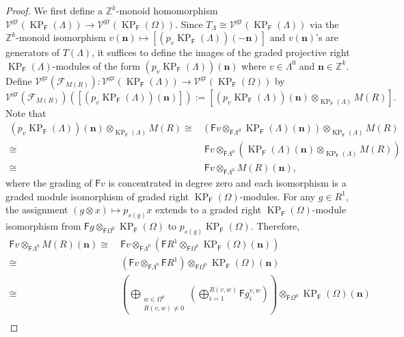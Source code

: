 \documentclass[12pt]{amsart}
\newcommand{\N}{\mathbf{n}}
\newcommand{\KP}{\operatorname{KP}}
\theoremstyle{definition}
\theoremstyle{remark}
\newcommand{\gr}{\operatorname{gr}}
\begin{document}
\begin{proof}
We first define a $\mathbb{Z}^k$-monoid homomorphism $\mathcal{V}^{\gr}(\KP_\mathsf{F}(\Lambda))\longrightarrow \mathcal{V}^{\gr}(\KP_\mathsf{F}(\Omega))$. Since $T_\Lambda\cong \mathcal{V}^{\gr}(\KP_\mathsf{F}(\Lambda))$ via the $\mathbb{Z}^k$-monoid isomorphism $v(\N)\longmapsto [(p_v\KP_\mathsf{F}(\Lambda))(-\N)]$ and $v(\N)$'s are generators of $T(\Lambda)$, it suffices to define the images of the graded projective right $\KP_\mathsf{F}(\Lambda)$-modules of the form $(p_v\KP_\mathsf{F}(\Lambda))(\N)$ where $v\in \Lambda^0$ and $\N\in \mathbb{Z}^k$. Define $\mathcal{V}^{\gr}(\mathcal{F}_{M(R)}):\mathcal{V}^{\gr}(\KP_\mathsf{F}(\Lambda))\longrightarrow \mathcal{V}^{\gr}(\KP_\mathsf{F}(\Omega))$ by \[\mathcal{V}^{\gr}(\mathcal{F}_{M(R)})\left([(p_v\KP_\mathsf{F}(\Lambda))(\N)]\right):=[(p_v\KP_\mathsf{F}(\Lambda))(\N)\otimes_{\KP_\mathsf{F}(\Lambda)}M(R)].\] 
Note that 
\begin{align*}
(p_v\KP_\mathsf{F}(\Lambda))(\N)\otimes_{\KP_\mathsf{F}(\Lambda)}M(R)\cong & \left(\mathsf{F}v\otimes_{\mathsf{F}\Lambda^0}\KP_\mathsf{F}(\Lambda)(\N)\right)\otimes_{\KP_\mathsf{F}(\Lambda)}M(R)\\
\cong & ~\mathsf{F}v\otimes_{\mathsf{F}\Lambda^0}\left(\KP_\mathsf{F}(\Lambda)(\N)\otimes_{\KP_\mathsf{F}(\Lambda)}M(R)\right)\\
\cong & ~\mathsf{F}v\otimes_{\mathsf{F}\Lambda^0}M(R)(\N),
\end{align*}
where the grading of $\mathsf{F}v$ is concentrated in degree zero and each isomorphism is a graded module isomorphism of graded right $\KP_\mathsf{F}(\Omega)$-modules. For any $g\in R^1$, the assignment $(g\otimes x)\longmapsto p_{s(g)} x$ extends to a graded right $\KP_\mathsf{F}(\Omega)$-module isomorphism from $\mathsf{F}g\otimes_{\mathsf{F}\Omega^0}\KP_\mathsf{F}(\Omega)$ to $p_{s(g)}\KP_\mathsf{F}(\Omega)$. Therefore,
\begin{align*}
    \mathsf{F}v\otimes_{\mathsf{F}\Lambda^0}M(R)(\N) \cong & ~\mathsf{F}v\otimes_{\mathsf{F}\Lambda^0}\left(\mathsf{F}R^1\otimes_{\mathsf{F}\Omega^0}\KP_{\mathsf{F}}(\Omega)(\N)\right)\\
    \cong &~\left(\mathsf{F}v\otimes_{\mathsf{F}\Lambda^0}\mathsf{F}R^1\right)\otimes_{\mathsf{F}\Omega^0}\KP_\mathsf{F}(\Omega)(\N)\\
    \cong &~\left(\displaystyle{\bigoplus_{\substack{w\in \Omega^0\\R(v,w)\neq 0}}}\left(\displaystyle{\bigoplus_{i=1}^{R(v,w)}} \mathsf{F}g_i^{v,w}\right)\right)\otimes_{\mathsf{F}\Omega^0}\KP_\mathsf{F}(\Omega)(\N)\\

\end{align*}
\end{proof}
\end{document}
